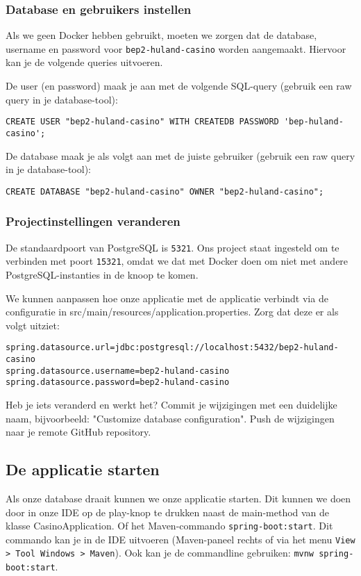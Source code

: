 \subsubsection{Database en gebruikers instellen}
Als we geen Docker hebben gebruikt, moeten we zorgen dat de database, username en password voor \texttt{bep2-huland-casino}
worden aangemaakt. Hiervoor kan je de volgende queries uitvoeren.

De user (en password) maak je aan met de volgende SQL-query (gebruik een raw query in je database-tool):
\begin{verbatim}
CREATE USER "bep2-huland-casino" WITH CREATEDB PASSWORD 'bep-huland-casino';
\end{verbatim}

De database maak je als volgt aan met de juiste gebruiker (gebruik een raw query in je database-tool): 
\begin{verbatim}
CREATE DATABASE "bep2-huland-casino" OWNER "bep2-huland-casino";
\end{verbatim}

\subsubsection{Projectinstellingen veranderen}
De standaardpoort van PostgreSQL is \texttt{5321}. 
Ons project staat ingesteld om te verbinden met poort \texttt{15321}, omdat we 
dat met Docker doen om niet met andere PostgreSQL-instanties in de knoop te komen.

We kunnen aanpassen hoe onze applicatie met de applicatie verbindt via 
de configuratie in src/main/resources/application.properties.
Zorg dat deze er als volgt uitziet:
\begin{verbatim}
spring.datasource.url=jdbc:postgresql://localhost:5432/bep2-huland-casino
spring.datasource.username=bep2-huland-casino
spring.datasource.password=bep2-huland-casino
\end{verbatim}

Heb je iets veranderd en werkt het? 
Commit je wijzigingen met een duidelijke naam, 
bijvoorbeeld: "Customize database configuration". 
Push de wijzigingen naar je remote GitHub repository.

\subsection{De applicatie starten}
Als onze database draait kunnen we onze applicatie starten.
Dit kunnen we doen door in onze IDE op de play-knop te drukken naast de main-method 
van de klasse CasinoApplication. Of het Maven-commando \texttt{spring-boot:start}.
Dit commando kan je in de IDE uitvoeren (Maven-paneel rechts of via het menu \texttt{View > Tool Windows > Maven}). 
Ook kan je de commandline gebruiken: \texttt{mvnw spring-boot:start}.

